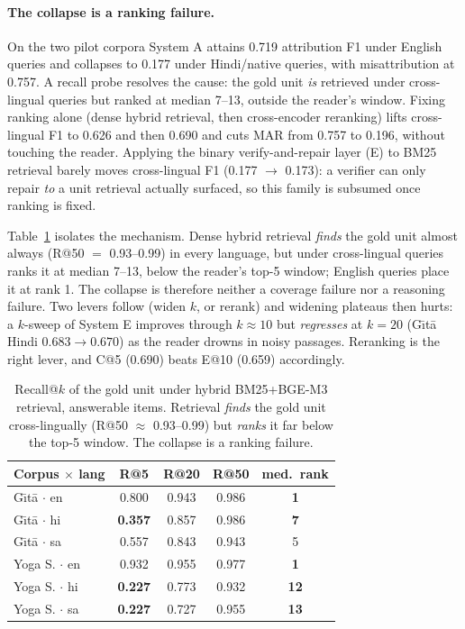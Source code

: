 \documentclass[11pt]{article}
\begin{document}
\paragraph{The collapse is a ranking failure.} On the two pilot corpora System A
attains 0.719 attribution F1 under English queries and collapses to 0.177 under
Hindi/native queries, with misattribution at 0.757. A recall probe resolves the
cause: the gold unit \emph{is} retrieved under cross-lingual queries but ranked
at median 7--13, outside the reader's window. Fixing ranking alone (dense
hybrid retrieval, then cross-encoder reranking) lifts cross-lingual F1 to 0.626
and then 0.690 and cuts MAR from 0.757 to 0.196,
without touching the reader. Applying the binary verify-and-repair layer (E) to
BM25 retrieval barely moves cross-lingual F1 (0.177 $\to$ 0.173): a verifier can
only repair \emph{to} a unit retrieval actually surfaced, so this family is
subsumed once ranking is fixed.

Table~\ref{tab:recall} isolates the mechanism. Dense hybrid retrieval
\emph{finds} the gold unit almost always (R@50 $=$ 0.93--0.99) in every language,
but under cross-lingual queries ranks it at median 7--13, below the reader's
top-5 window; English queries place it at rank 1. The collapse is therefore
neither a coverage failure nor a reasoning failure. Two levers follow (widen $k$,
or rerank) and widening plateaus then hurts: a $k$-sweep of System E improves
through $k\!\approx\!10$ but \emph{regresses} at $k\!=\!20$ (G\={\i}t\={a} Hindi
$0.683\!\to\!0.670$) as the reader drowns in noisy passages. Reranking is the
right lever, and C@5 (0.690) beats E@10 (0.659) accordingly.

\begin{table}[t]
\centering\small
\begin{tabular}{@{}lcccc@{}}
\toprule
\textbf{Corpus $\times$ lang} & \textbf{R@5} & \textbf{R@20} & \textbf{R@50} & \textbf{med.\ rank} \\
\midrule
G\={\i}t\={a} $\cdot$ en & 0.800 & 0.943 & 0.986 & \textbf{1} \\
G\={\i}t\={a} $\cdot$ hi & \textbf{0.357} & 0.857 & 0.986 & \textbf{7} \\
G\={\i}t\={a} $\cdot$ sa & 0.557 & 0.843 & 0.943 & 5 \\
Yoga S. $\cdot$ en & 0.932 & 0.955 & 0.977 & \textbf{1} \\
Yoga S. $\cdot$ hi & \textbf{0.227} & 0.773 & 0.932 & \textbf{12} \\
Yoga S. $\cdot$ sa & \textbf{0.227} & 0.727 & 0.955 & \textbf{13} \\
\bottomrule
\end{tabular}
\caption{Recall@$k$ of the gold unit under hybrid BM25+BGE-M3 retrieval,
answerable items. Retrieval \emph{finds} the gold unit cross-lingually
(R@50 $\approx$ 0.93--0.99) but \emph{ranks} it far below the top-5 window.
The collapse is a ranking failure.}
\label{tab:recall}
\end{table}
\end{document}
